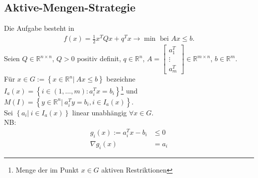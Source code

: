 \subsection{Aktive-Mengen-Strategie}
Die Aufgabe besteht in
\begin{align}
  f(x) = \frac12 x^TQx+q^Tx\rightarrow\min\text{ bei } Ax\le b.
\end{align}
Seien $Q\in\mathbb{R}^{n\times n}$, $Q>0$ positiv definit, $q\in\mathbb{R}^n$, $A=\begin{bmatrix}a_1^T\\\vdots\\ a_m^T\end{bmatrix}\in\mathbb{R}^{m\times n}$, $b\in\mathbb{R}^m$.\\
Für $x\in G:=\left\{x\in\mathbb{R}^n|\ Ax\le b \right\}$ bezeichne $I_a(x)=\left\{i\in(1,\ldots,m):a_i^Tx=b_i\right\}$\footnote{Menge der im Punkt $x\in G$ aktiven Restriktionen} und
$M(I) = \left\{y\in\mathbb{R}^n|\ a_i^Ty=b_i, i\in I_a(x) \right\}$.\\
Sei $\left\{a_i|\ i\in I_a(x) \right\}$ linear unabhängig $\forall x\in G$.\\
\ac{NB}:
\begin{align*}
  g_i(x) := a_i^Tx -b_i & \le 0\\
  \nabla g_i(x) & = a_i
\end{align*}

